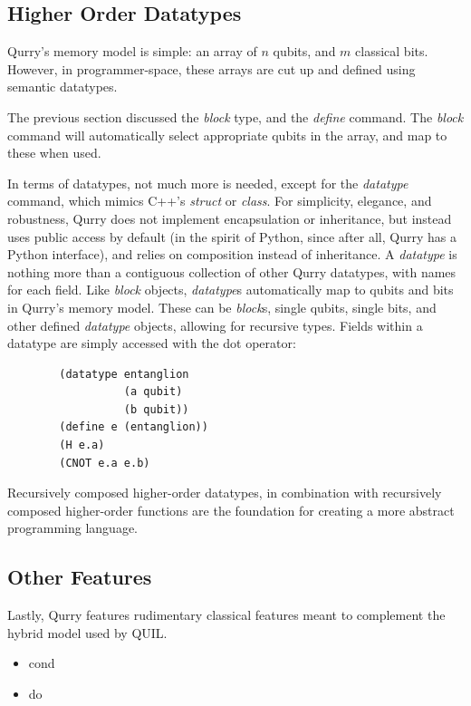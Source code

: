 \documentclass[a4paper,twocolumn,11pt,accepted=2017-05-09]{quantumarticle}
\begin{document}
    \subsection{Higher Order Datatypes}

    Qurry's memory model is simple: an array of $n$ qubits, and $m$ classical bits.
    However, in programmer-space, these arrays are cut up and defined using semantic datatypes.

    The previous section discussed the \emph{block} type, and the \emph{define} command.
    The \emph{block} command will automatically select appropriate qubits in the array, and map to these when used.

    In terms of datatypes, not much more is needed, except for the \emph{datatype} command, which mimics C++'s \emph{struct} or \emph{class}.
    For simplicity, elegance, and robustness, Qurry does not implement encapsulation or inheritance, but instead uses public access by default (in the spirit of Python, since after all, Qurry has a Python interface), and relies on composition instead of inheritance.
    A \emph{datatype} is nothing more than a contiguous collection of other Qurry datatypes, with names for each field.
    Like \emph{block} objects, \emph{datatype}s automatically map to qubits and bits in Qurry's memory model.
    These can be \emph{block}s, single qubits, single bits, and other defined \emph{datatype} objects, allowing for recursive types.
    Fields within a datatype are simply accessed with the dot operator:
    \begin{lstlisting}
        (datatype entanglion
                  (a qubit)
                  (b qubit))
        (define e (entanglion))
        (H e.a)
        (CNOT e.a e.b)
    \end{lstlisting}

    Recursively composed higher-order datatypes, in combination with recursively composed higher-order functions are the foundation for creating a more abstract programming language.

    \subsection{Other Features}

    Lastly, Qurry features rudimentary classical features meant to complement the hybrid model used by QUIL.

    \begin{itemize}
        \item cond 	    
        \item do 	        
    \end{itemize}
\end{document}
